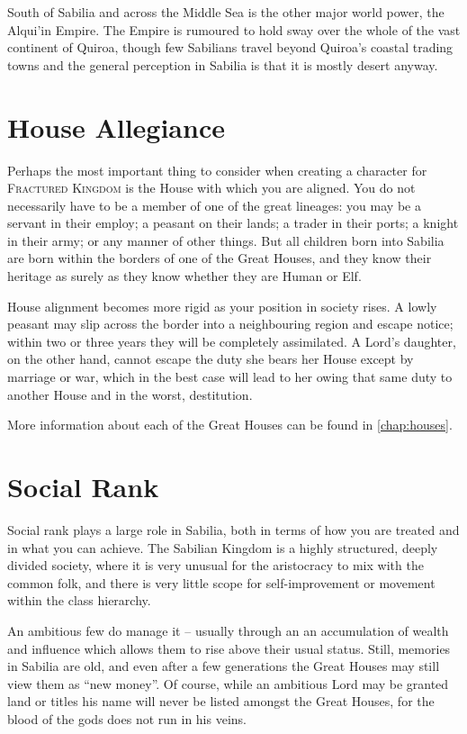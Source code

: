 \documentclass[10pt,twoside,openright,a4paper,twocolumn]{book}
\begin{document}
South of Sabilia and across the Middle Sea is the other major world power, the
Alqui'in Empire.  The Empire is rumoured to hold sway over the whole of the
vast continent of Quiroa, though few Sabilians travel beyond Quiroa's coastal
trading towns and the general perception in Sabilia is that it is mostly desert
anyway.

\section{House Allegiance}

Perhaps the most important thing to consider when creating a character for
\textsc{Fractured Kingdom} is the House with which you are aligned.  You do not
necessarily have to be a member of one of the great lineages: you may be a
servant in their employ; a peasant on their lands; a trader in their ports; a
knight in their army; or any manner of other things.  But all children born
into Sabilia are born within the borders of one of the Great Houses, and they
know their heritage as surely as they know whether they are Human or Elf.

House alignment becomes more rigid as your position in society rises.  A lowly
peasant may slip across the border into a neighbouring region and escape
notice; within two or three years they will be completely assimilated.  A
Lord's daughter, on the other hand, cannot escape the duty she bears her House
except by marriage or war, which in the best case will lead to her owing that
same duty to another House and in the worst, destitution.

More information about each of the Great Houses can be found in
\autoref{chap:houses}.

\section{Social Rank}

Social rank plays a large role in Sabilia, both in terms of how you are treated
and in what you can achieve.  The Sabilian Kingdom is a highly structured,
deeply divided society, where it is very unusual for the aristocracy to mix
with the common folk, and there is very little scope for self-improvement or
movement within the class hierarchy.

An ambitious few do manage it -- usually through an an accumulation of wealth
and influence which allows them to rise above their usual status.  Still,
memories in Sabilia are old, and even after a few generations the Great Houses
may still view them as ``new money''.  Of course, while an ambitious Lord may
be granted land or titles his name will never be listed amongst the Great
Houses, for the blood of the gods does not run in his veins.
\end{document}
